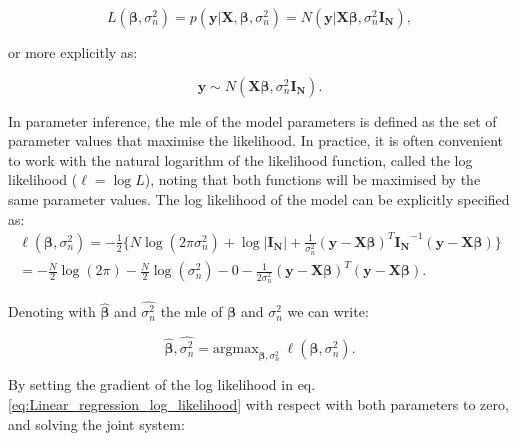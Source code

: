 \begin{equation} \label{eq:Linear_regression_likelihood}
 L(\boldsymbol{\beta}, \sigma_n^2) = p(\mathbf{y}| \mathbf{X}, \boldsymbol{\beta}, \sigma_n^2) = N(\mathbf{y} | \mathbf{X}\boldsymbol{\beta}, \sigma_n^2 \mathbf{I_N}), 
\end{equation}

or more explicitly as:

\begin{equation} \label{eq:Linear_regression_MVN_form}
\mathbf{y} \sim N(\mathbf{X}\boldsymbol{\beta}, \sigma_n^2 \mathbf{I_N}). 
\end{equation}

In parameter inference, the \gls{mle} of the model parameters is defined as the set of parameter values that maximise the likelihood.
In practice, it is often convenient to work with the natural logarithm of the likelihood function, called the log likelihood ($\ell = \log L$), noting that both functions will be maximised by the same parameter values.
The log likelihood of the model can be explicitly specified as:\\

\begin{equation} \label{eq:Linear_regression_log_likelihood}
\begin{split}
 \ell(\boldsymbol{\beta}, \sigma_n^2) = -\frac{1}{2} \bigg\{N \log (2\pi\sigma_n^2) + \log |\mathbf{I_N}|+ \frac{1}{\sigma_n^2}(\mathbf{y}-\mathbf{X}\boldsymbol{\beta})^T\mathbf{I_N}^{-1}(\mathbf{y}-\mathbf{X}\boldsymbol{\beta}) \bigg\} \\
= -\frac{N}{2} \log (2\pi) - \frac{N}{2} \log(\sigma_n^2)- 0 - \frac{1}{2\sigma_n^2}(\mathbf{y}-\mathbf{X}\boldsymbol{\beta})^T(\mathbf{y}-\mathbf{X}\boldsymbol{\beta}). 
\end{split}
\end{equation}

Denoting with $\hat{\boldsymbol{\beta}}$ and $\hat{\sigma_n^2}$ the \gls{mle} of $\boldsymbol{\beta}$ and $\sigma_n^2$ we can write:

\begin{equation} \label{eq:Linear_regression_MLEs}
\hat{\boldsymbol{\beta}},\hat{\sigma_n^2} = \mathrm{argmax}_{\boldsymbol{\beta},\sigma_n^2} \ \ell(\boldsymbol{\beta}, \sigma_n^2). 
\end{equation} 

By setting the gradient of the log likelihood in eq. \eqref{eq:Linear_regression_log_likelihood} with respect with both parameters to zero, and solving the joint system:


